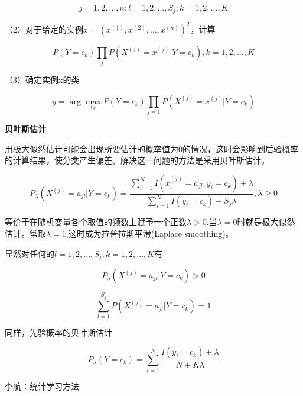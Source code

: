 \documentclass{ctexart}
\begin{document}
	\[j=1,2,...,n; l=1,2,...,S_j; k=1,2,...,K\]	
	
	（2）对于给定的实例\(x = (x^{(1)}, x^{(2)},...,x^{(n)})^T\)，计算
	
	\[P(Y=c_k)\prod_{j}P(X^{(j)}=x^{(j)}|Y=c_k), k=1,2,...,K\]
	
	（3）确定实例x的类
	
	\[y=\arg \max_{c_k} P(Y=c_k)\prod_{j=1}P(X^{(j)}=x^{(j)}|Y=c_k)\]
	
	\textbf{贝叶斯估计}
	
	用极大似然估计可能会出现所要估计的概率值为0的情况，这时会影响到后验概率的计算结果，使分类产生偏差。解决这一问题的方法是采用贝叶斯估计。
	
	\[P_\lambda(X^{(j)} = a_{jl}|Y=c_k) = \frac{\sum\limits_{i=1}^{N}I(x_i^{(j)} = a_{jl}, y_i = c_k)+\lambda}{\sum\limits_{i=1}^{N}I(y_i=c_k)+S_j\lambda}, \lambda \geq 0\]
	
	等价于在随机变量各个取值的频数上赋予一个正数\(\lambda > 0\).当\(\lambda = 0\)时就是极大似然估计。常取\(\lambda = 1\),这时成为拉普拉斯平滑(Laplace smoothing)。
	
	显然对任何的\(l=1,2,...,S_j,  k=1,2,...,K\)有
	
	\[P_\lambda(X^{(j)} = a_{jl}|Y=c_k)  > 0\]
	
	\[\sum_{l=1}^{S_j}P(X^{(j)} = a_{jl}|Y=c_k) = 1\]
	
	同样，先验概率的贝叶斯估计
	
	\[P_\lambda(Y=c_k)=\sum_{i=1}^{N}\frac{I(y_i = c_k)+\lambda}{N+K\lambda}\]
	
	
	

	
	
	
	
	
	
	
	
	
	
	
	\begin{thebibliography}{99}
		李航：统计学习方法
	\end{thebibliography}
	
	
	
	
\end{document}
